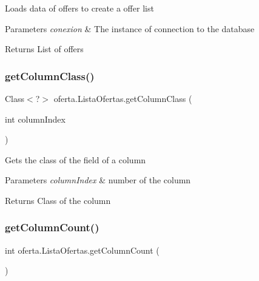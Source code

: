 Loads data of offers to create a offer list 
\begin{DoxyParams}{Parameters}
{\em conexion} & The instance of connection to the database \\
\hline
\end{DoxyParams}
\begin{DoxyReturn}{Returns}
List of offers 
\end{DoxyReturn}
\mbox{\label{classoferta_1_1_lista_ofertas_a86faae91c71fe103470f039a09213048}} 
\subsubsection{\texorpdfstring{get\+Column\+Class()}{getColumnClass()}}
{\footnotesize\ttfamily Class$<$?$>$ oferta.\+Lista\+Ofertas.\+get\+Column\+Class (\begin{DoxyParamCaption}\item[{int}]{column\+Index }\end{DoxyParamCaption})\hspace{0.3cm}{\ttfamily [inline]}}

Gets the class of the field of a column 
\begin{DoxyParams}{Parameters}
{\em column\+Index} & number of the column \\
\hline
\end{DoxyParams}
\begin{DoxyReturn}{Returns}
Class of the column 
\end{DoxyReturn}
\mbox{\label{classoferta_1_1_lista_ofertas_a1134f680b1eb3a296d3f0db1f5f6c708}} 
\subsubsection{\texorpdfstring{get\+Column\+Count()}{getColumnCount()}}
{\footnotesize\ttfamily int oferta.\+Lista\+Ofertas.\+get\+Column\+Count (\begin{DoxyParamCaption}{ }\end{DoxyParamCaption})\hspace{0.3cm}{\ttfamily [inline]}}

